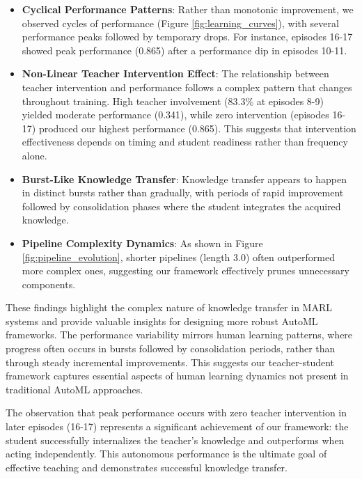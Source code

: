 \documentclass[twoside,11pt]{article}
\begin{document}
\begin{itemize}
    \item \textbf{Cyclical Performance Patterns}: Rather than monotonic improvement, we observed cycles of performance (Figure \ref{fig:learning_curves}), with several performance peaks followed by temporary drops. For instance, episodes 16-17 showed peak performance (0.865) after a performance dip in episodes 10-11.
    
    \item \textbf{Non-Linear Teacher Intervention Effect}: The relationship between teacher intervention and performance follows a complex pattern that changes throughout training. High teacher involvement (83.3\% at episodes 8-9) yielded moderate performance (0.341), while zero intervention (episodes 16-17) produced our highest performance (0.865). This suggests that intervention effectiveness depends on timing and student readiness rather than frequency alone.
    
    \item \textbf{Burst-Like Knowledge Transfer}: Knowledge transfer appears to happen in distinct bursts rather than gradually, with periods of rapid improvement followed by consolidation phases where the student integrates the acquired knowledge.
    
    \item \textbf{Pipeline Complexity Dynamics}: As shown in Figure \ref{fig:pipeline_evolution}, shorter pipelines (length 3.0) often outperformed more complex ones, suggesting our framework effectively prunes unnecessary components.
\end{itemize}

These findings highlight the complex nature of knowledge transfer in MARL systems and provide valuable insights for designing more robust AutoML frameworks. The performance variability mirrors human learning patterns, where progress often occurs in bursts followed by consolidation periods, rather than through steady incremental improvements. This suggests our teacher-student framework captures essential aspects of human learning dynamics not present in traditional AutoML approaches.

The observation that peak performance occurs with zero teacher intervention in later episodes (16-17) represents a significant achievement of our framework: the student successfully internalizes the teacher's knowledge and outperforms when acting independently. This autonomous performance is the ultimate goal of effective teaching and demonstrates successful knowledge transfer.
\end{document}

